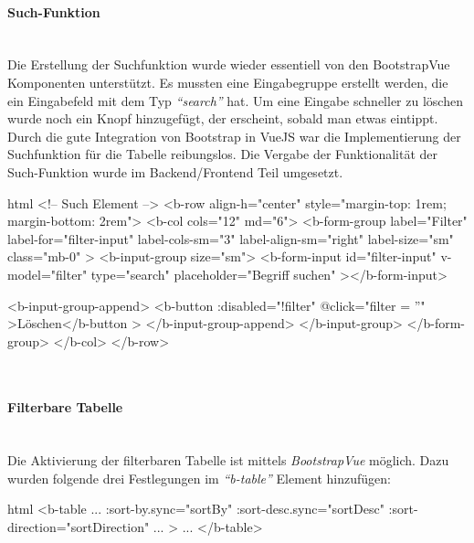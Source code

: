 \paragraph{Such-Funktion}
~\\
Die Erstellung der Suchfunktion wurde wieder essentiell von den BootstrapVue Komponenten unterstützt. Es mussten eine Eingabegruppe erstellt werden, die ein Eingabefeld mit dem Typ \textit{\enquote{search}} hat. Um eine Eingabe schneller zu löschen wurde noch ein Knopf hinzugefügt, der erscheint, sobald man etwas eintippt. Durch die gute Integration von Bootstrap in VueJS war die Implementierung der Suchfunktion für die Tabelle reibungslos. Die Vergabe der Funktionalität der Such-Funktion wurde im Backend/Frontend Teil umgesetzt.
\begin{code}{html}
	<!-- Such Element -->
    <b-row align-h="center" style="margin-top: 1rem; margin-bottom: 2rem">
      <b-col cols="12" md="6">
        <b-form-group
          label="Filter"
          label-for="filter-input"
          label-cols-sm="3"
          label-align-sm="right"
          label-size="sm"
          class="mb-0"
        >
          <b-input-group size="sm">
            <b-form-input
              id="filter-input"
              v-model="filter"
              type="search"
              placeholder="Begriff suchen"
            ></b-form-input>

            <b-input-group-append>
              <b-button :disabled="!filter" @click="filter = ''"
                >Löschen</b-button
              >
            </b-input-group-append>
          </b-input-group>
        </b-form-group>
      </b-col>
    </b-row>
\end{code}
	\label{list:antragsearchcode} ~\\
\paragraph{Filterbare Tabelle}
~\\
Die Aktivierung der filterbaren Tabelle ist mittels \textit{BootstrapVue} möglich. Dazu wurden folgende drei Festlegungen im \textit{\enquote{b-table}} Element hinzufügen:
\begin{code}{html}
	<b-table
		...
		:sort-by.sync="sortBy"
      	:sort-desc.sync="sortDesc"
      	:sort-direction="sortDirection"
		...
	>
	...
	</b-table>
\end{code}
	\label{list:antragfiltercode} ~\\
